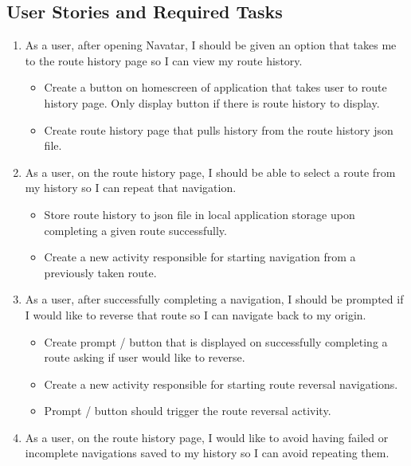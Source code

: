 \documentclass{scrreprt}
\begin{document}
\subsection{User Stories and Required Tasks}
\begin{enumerate}
	\item As a user, after opening Navatar, I should be given an option that takes me to the route history page so I can view my route history.
	
		\begin{itemize}
			\item Create a button on homescreen of application that takes user to route history page. Only display button if there is route history to display.
			\item Create route history page that pulls history from the route history json file.
		\end{itemize}
	
	\item As a user, on the route history page, I should be able to select a route from my history so I can repeat that navigation.
	
		\begin{itemize}
			\item Store route history to json file in local application storage upon completing a given route successfully.
			\item Create a new activity responsible for starting navigation from a previously taken route.
		\end{itemize}
\pagebreak
	\item As a user, after successfully completing a navigation, I should be prompted if I would like to reverse that route so I can navigate back to my origin.
	
		\begin{itemize}
			\item Create prompt / button that is displayed on successfully completing a route asking if user would like to reverse.
			\item Create a new activity responsible for starting route reversal navigations.
			\item Prompt / button should trigger the route reversal activity.
		\end{itemize}

	\item As a user, on the route history page, I would like to avoid having failed or incomplete navigations saved to my history so I can avoid repeating them.
	

\end{enumerate}
\end{document}
